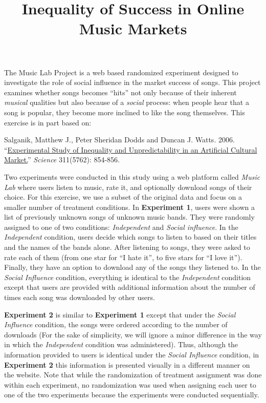 \documentclass[]{article}
\title{Inequality of Success in Online Music Markets}
\author{}
\date{}
\begin{document}
\maketitle


The Music Lab Project is a web based randomized experiment designed to
investigate the role of social influence in the market success of songs.
This project examines whether songs becomes ``hits'' not only because of
their inherent \emph{musical} qualities but also because of a
\emph{social} process: when people hear that a song is popular, they
become more inclined to like the song themselves. This exercise is in
part based on:

Salganik, Matthew J., Peter Sheridan Dodds and Duncan J. Watts. 2006.
``\href{http://dx.doi.org/10.1126/science.1121066}{Experimental Study of
Inequality and Unpredictability in an Artificial Cultural Market.}''
\emph{Science} 311(5762): 854-856.

Two experiments were conducted in this study using a web platform called
\emph{Music Lab} where users listen to music, rate it, and optionally
download songs of their choice. For this exercise, we use a subset of
the original data and focus on a smaller number of treatment conditions.
In \textbf{Experiment 1}, users were shown a list of previously unknown
songs of unknown music bands. They were randomly assigned to one of two
conditions: \emph{Independent} and \emph{Social influence}. In the
\emph{Independent} condition, users decide which songs to listen to
based on their titles and the names of the bands alone. After listening
to songs, they were asked to rate each of them (from one star for ``I
hate it'', to five stars for ``I love it''). Finally, they have an
option to download any of the songs they listened to. In the
\emph{Social Influence} condition, everything is identical to the
\emph{Independent} condition except that users are provided with
additional information about the number of times each song was
downloaded by other users.

\textbf{Experiment 2} is similar to \textbf{Experiment 1} except that
under the \emph{Social Influence} condition, the songs were ordered
according to the number of downloads (For the sake of simplicity, we
will ignore a minor difference in the way in which the
\emph{Independent} condition was administered). Thus, although the
information provided to users is identical under the \emph{Social
Influence} condition, in \textbf{Experiment 2} this information is
presented visually in a different manner on the website. Note that while
the randomization of treatment assignment was done within each
experiment, no randomization was used when assigning each user to one of
the two experiments because the experiments were conducted sequentially.
\end{document}
